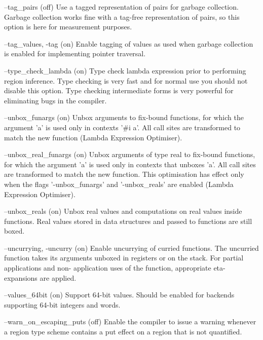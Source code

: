 \documentclass[12pt]{book}
\begin{document}
\begin{scriptcode}
--tag_pairs                                              (off)
     Use a tagged representation of pairs for garbage
     collection. Garbage collection works fine with a
     tag-free representation of pairs, so this option
     is here for measurement purposes.

--tag_values, -tag                                        (on)
     Enable tagging of values as used when garbage
     collection is enabled for implementing pointer
     traversal.

--type_check_lambda                                       (on)
     Type check lambda expression prior to performing region
     inference. Type checking is very fast and for normal use
     you should not disable this option. Type checking
     intermediate forms is very powerful for eliminating bugs
     in the compiler.

--unbox_funargs                                           (on)
     Unbox arguments to fix-bound functions, for which the
     argument 'a' is used only in contexts '#i a'. All call
     sites are transformed to match the new function (Lambda
     Expression Optimiser).

--unbox_real_funargs                                      (on)
     Unbox arguments of type real to fix-bound functions, for which
     the argument 'a' is used only in contexts that unboxes 'a'. All
     call sites are transformed to match the new function. This
     optimisation has effect only when the flags '-unbox_funargs' and
     '-unbox_reals' are enabled (Lambda Expression Optimiser).

--unbox_reals                                             (on)
     Unbox real values and computations on real values inside
     functions. Real values stored in data structures and
     passed to functions are still boxed.

--uncurrying, -uncurry                                    (on)
     Enable uncurrying of curried functions. The uncurried
     function takes its arguments unboxed in registers or
     on the stack. For partial applications and non-
     application uses of the function, appropriate eta-
     expansions are applied.

--values_64bit                                            (on)
     Support 64-bit values. Should be enabled for
     backends supporting 64-bit integers and words.

--warn_on_escaping_puts                                  (off)
     Enable the compiler to issue a warning whenever a
     region type scheme contains a put effect on a region
     that is not quantified.


\end{scriptcode}
\end{document}
